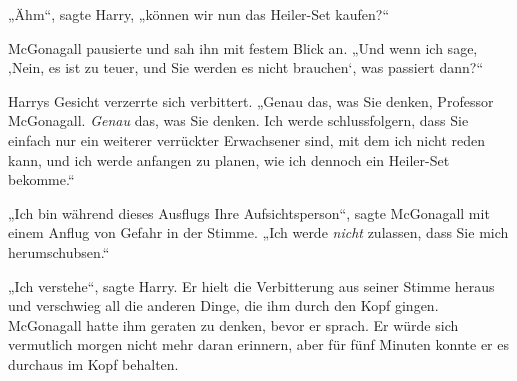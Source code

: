 „Ähm“, sagte Harry, „können wir nun das Heiler-Set kaufen?“

McGonagall pausierte und sah ihn mit festem Blick an.
„Und wenn ich sage, ‚Nein, es ist zu teuer, und Sie werden es nicht brauchen‘, was passiert dann?“

Harrys Gesicht verzerrte sich verbittert.
„Genau das, was Sie denken, Professor McGonagall. \emph{Genau} das, was Sie denken. Ich werde schlussfolgern, dass Sie einfach nur ein weiterer verrückter Erwachsener sind, mit dem ich nicht reden kann, und ich werde anfangen zu planen, wie ich dennoch ein Heiler-Set bekomme.“

„Ich bin während dieses Ausflugs Ihre Aufsichtsperson“, sagte McGonagall mit einem Anflug von Gefahr in der Stimme.
„Ich werde \emph{nicht} zulassen, dass Sie mich herumschubsen.“

„Ich verstehe“, sagte Harry. Er hielt die Verbitterung aus seiner Stimme heraus und verschwieg all die anderen Dinge, die ihm durch den Kopf gingen. McGonagall hatte ihm geraten zu denken, bevor er sprach. Er würde sich vermutlich morgen nicht mehr daran erinnern, aber für fünf Minuten konnte er es durchaus im Kopf behalten.

